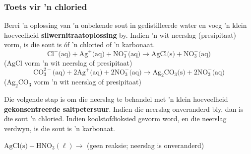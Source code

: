             \subsubsection*{Toets vir  'n chloried}
            \nopagebreak
Berei  'n oplossing van   'n onbekende sout in gedistilleerde water en voeg  'n klein hoeveelheid \textbf{silwernitraatoplossing} by. Indien  'n wit neerslag (presipitaat) vorm, is die sout is óf  'n chloried of  'n karbonaat.
        \label{m38719*id341148}\nopagebreak\noindent{}
    \begin{equation*}
    {\text{Cl}}^{-} \text{(aq)} +{\text{Ag}}^{+} \text{(aq)} + \text{NO}_{3}^{-} \text{(aq)} \to \text{AgCl} \text{(s)} +\text{NO}_{3}^{-} \text{(aq)}
      \end{equation*}
     ($\text{AgCl}$ vorm  'n wit neerslag of presipitaat)
        \label{m38719*id341211}\nopagebreak\noindent{}
    \begin{equation*}
    \text{CO}_{3}^{2-} \text{(aq)} + 2{\text{Ag}}^{+} \text{(aq)} + 2\text{NO}_{3}^{-} \text{(aq)} \to {\text{Ag}}_{2}{\text{CO}}_{3} \text{(s)} + 2\text{NO}_{3}^{-} \text{(aq)}
      \end{equation*}
    (${\text{Ag}}_{2}{\text{CO}}_{3}$ vorm  'n wit neerslag of presipitaat)\par 
        \label{m38719*id341323}Die volgende stap is om die neerslag te behandel met  'n klein hoeveelheid \textbf{gekonsentreerde saltpetersuur}. Indien die neerslag onveranderd bly, dan is die sout  'n chloried.  Indien koolstofdioksied gevorm word, en die neerslag verdwyn, is die sout is  'n karbonaat.\par 
        $\text{AgCl} \text{(s)} + {\text{HNO}}_{3} (\ell) \to $ (geen reaksie; neerslag is onveranderd)\par 
